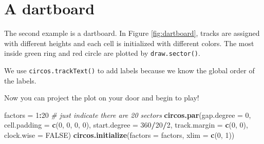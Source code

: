\documentclass[]{book}
\newenvironment{Shaded}{\begin{snugshade}}{\end{snugshade}}
\newcommand{\KeywordTok}[1]{\textcolor[rgb]{0.13,0.29,0.53}{\textbf{#1}}}
\newcommand{\DataTypeTok}[1]{\textcolor[rgb]{0.13,0.29,0.53}{#1}}
\newcommand{\DecValTok}[1]{\textcolor[rgb]{0.00,0.00,0.81}{#1}}
\newcommand{\StringTok}[1]{\textcolor[rgb]{0.31,0.60,0.02}{#1}}
\newcommand{\CommentTok}[1]{\textcolor[rgb]{0.56,0.35,0.01}{\textit{#1}}}
\newcommand{\OtherTok}[1]{\textcolor[rgb]{0.56,0.35,0.01}{#1}}
\newcommand{\OperatorTok}[1]{\textcolor[rgb]{0.81,0.36,0.00}{\textbf{#1}}}
\newcommand{\NormalTok}[1]{#1}
\theoremstyle{definition}
\theoremstyle{definition}
\theoremstyle{remark}
\begin{document}
\section{A dartboard}\label{a-dartboard}

The second example is a dartboard. In Figure \ref{fig:dartboard}, tracks
are assigned with different heights and each cell is initialized with
different colors. The most inside green ring and red circle are plotted
by \texttt{draw.sector()}.

We use \texttt{circos.trackText()} to add labels because we know the
global order of the labels.

Now you can project the plot on your door and begin to play!

\begin{Shaded}
\begin{Highlighting}[]
\NormalTok{factors =}\StringTok{ }\DecValTok{1}\OperatorTok{:}\DecValTok{20}  \CommentTok{# just indicate there are 20 sectors}
\KeywordTok{circos.par}\NormalTok{(}\DataTypeTok{gap.degree =} \DecValTok{0}\NormalTok{, }\DataTypeTok{cell.padding =} \KeywordTok{c}\NormalTok{(}\DecValTok{0}\NormalTok{, }\DecValTok{0}\NormalTok{, }\DecValTok{0}\NormalTok{, }\DecValTok{0}\NormalTok{),}
    \DataTypeTok{start.degree =} \DecValTok{360}\OperatorTok{/}\DecValTok{20}\OperatorTok{/}\DecValTok{2}\NormalTok{, }\DataTypeTok{track.margin =} \KeywordTok{c}\NormalTok{(}\DecValTok{0}\NormalTok{, }\DecValTok{0}\NormalTok{), }\DataTypeTok{clock.wise =} \OtherTok{FALSE}\NormalTok{)}
\KeywordTok{circos.initialize}\NormalTok{(}\DataTypeTok{factors =}\NormalTok{ factors, }\DataTypeTok{xlim =} \KeywordTok{c}\NormalTok{(}\DecValTok{0}\NormalTok{, }\DecValTok{1}\NormalTok{))}


\end{Highlighting}
\end{Shaded}
\end{document}

